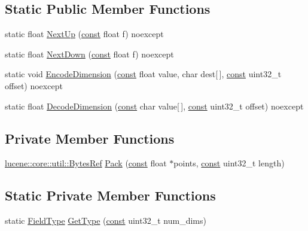 \subsection*{Static Public Member Functions}
\begin{DoxyCompactItemize}
\item 
static float \mbox{\hyperlink{classlucene_1_1core_1_1document_1_1FloatPoint_ab6b6b86250786703f7a46e7028cd6dfd}{Next\+Up}} (\mbox{\hyperlink{ZlibCrc32_8h_a2c212835823e3c54a8ab6d95c652660e}{const}} float f) noexcept
\item 
static float \mbox{\hyperlink{classlucene_1_1core_1_1document_1_1FloatPoint_a0cac69cd699b0645a195b2ae58eaf5d0}{Next\+Down}} (\mbox{\hyperlink{ZlibCrc32_8h_a2c212835823e3c54a8ab6d95c652660e}{const}} float f) noexcept
\item 
static void \mbox{\hyperlink{classlucene_1_1core_1_1document_1_1FloatPoint_ab8494f2f0e931bec1fdf34dec7954db9}{Encode\+Dimension}} (\mbox{\hyperlink{ZlibCrc32_8h_a2c212835823e3c54a8ab6d95c652660e}{const}} float value, char dest\mbox{[}$\,$\mbox{]}, \mbox{\hyperlink{ZlibCrc32_8h_a2c212835823e3c54a8ab6d95c652660e}{const}} uint32\+\_\+t offset) noexcept
\item 
static float \mbox{\hyperlink{classlucene_1_1core_1_1document_1_1FloatPoint_adda5c047a340264e4d10e8a47fe513ba}{Decode\+Dimension}} (\mbox{\hyperlink{ZlibCrc32_8h_a2c212835823e3c54a8ab6d95c652660e}{const}} char value\mbox{[}$\,$\mbox{]}, \mbox{\hyperlink{ZlibCrc32_8h_a2c212835823e3c54a8ab6d95c652660e}{const}} uint32\+\_\+t offset) noexcept
\end{DoxyCompactItemize}
\subsection*{Private Member Functions}
\begin{DoxyCompactItemize}
\item 
\mbox{\hyperlink{classlucene_1_1core_1_1util_1_1BytesRef}{lucene\+::core\+::util\+::\+Bytes\+Ref}} \mbox{\hyperlink{classlucene_1_1core_1_1document_1_1FloatPoint_ad3370170ead68941120b8f8c7af1aaa2}{Pack}} (\mbox{\hyperlink{ZlibCrc32_8h_a2c212835823e3c54a8ab6d95c652660e}{const}} float $\ast$points, \mbox{\hyperlink{ZlibCrc32_8h_a2c212835823e3c54a8ab6d95c652660e}{const}} uint32\+\_\+t length)
\end{DoxyCompactItemize}
\subsection*{Static Private Member Functions}
\begin{DoxyCompactItemize}
\item 
static \mbox{\hyperlink{classlucene_1_1core_1_1document_1_1FieldType}{Field\+Type}} \mbox{\hyperlink{classlucene_1_1core_1_1document_1_1FloatPoint_a6f95b1c279cf34c497e0eaa2d7a19fdc}{Get\+Type}} (\mbox{\hyperlink{ZlibCrc32_8h_a2c212835823e3c54a8ab6d95c652660e}{const}} uint32\+\_\+t num\+\_\+dims)
\end{DoxyCompactItemize}
